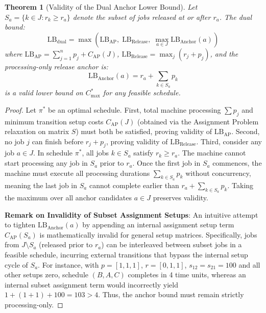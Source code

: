 \documentclass[journal]{IEEEtran}
\newtheorem{theorem}{Theorem}
\begin{document}
\begin{theorem}[Validity of the Dual Anchor Lower Bound]
\label{thm:lower_bound}
Let $S_a = \{k \in J : r_k \ge r_a\}$ denote the subset of jobs released at or after $r_a$. The dual bound:
\begin{equation}
    \text{LB}_{\text{dual}} = \max\left( \text{LB}_{\text{AP}}, \; \text{LB}_{\text{Release}}, \; \max_{a \in J} \text{LB}_{\text{Anchor}}(a) \right)
\end{equation}
where $\text{LB}_{\text{AP}} = \sum_{j=1}^n p_j + C_{\text{AP}}(J)$, $\text{LB}_{\text{Release}} = \max_j (r_j + p_j)$, and the processing-only release anchor is:
\begin{equation}
    \text{LB}_{\text{Anchor}}(a) = r_a + \sum_{k \in S_a} p_k
\end{equation}
is a valid lower bound on $C_{\max}^*$ for any feasible schedule.
\end{theorem}

\begin{proof}
Let $\pi^*$ be an optimal schedule. First, total machine processing $\sum p_j$ and minimum transition setup costs $C_{\text{AP}}(J)$ (obtained via the Assignment Problem relaxation \cite{kuhn1955hungarian} on matrix $S$) must both be satisfied, proving validity of $\text{LB}_{\text{AP}}$. Second, no job $j$ can finish before $r_j + p_j$, proving validity of $\text{LB}_{\text{Release}}$. Third, consider any job $a \in J$. In schedule $\pi^*$, all jobs $k \in S_a$ satisfy $r_k \ge r_a$. The machine cannot start processing any job in $S_a$ prior to $r_a$. Once the first job in $S_a$ commences, the machine must execute all processing durations $\sum_{k \in S_a} p_k$ without concurrency, meaning the last job in $S_a$ cannot complete earlier than $r_a + \sum_{k \in S_a} p_k$. Taking the maximum over all anchor candidates $a \in J$ preserves validity.

\textbf{Remark on Invalidity of Subset Assignment Setups}: An intuitive attempt to tighten $\text{LB}_{\text{Anchor}}(a)$ by appending an internal assignment setup term $C_{\text{AP}}(S_a)$ is mathematically invalid for general setup matrices. Specifically, jobs from $J \setminus S_a$ (released prior to $r_a$) can be interleaved between subset jobs in a feasible schedule, incurring external transitions that bypass the internal setup cycle of $S_a$. For instance, with $p=[1,1,1]$, $r=[0,1,1]$, $s_{12}=s_{21}=100$ and all other setups zero, schedule $(B, A, C)$ completes in 4 time units, whereas an internal subset assignment term would incorrectly yield $1 + (1+1) + 100 = 103 > 4$. Thus, the anchor bound must remain strictly processing-only.
\end{proof}
\end{document}
